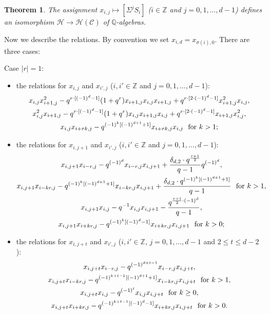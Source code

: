 \documentclass[reqno,12pt,a4paper]{amsart}
\newtheorem{theorem}{Theorem}[section]
\theoremstyle{remark}
\theoremstyle{definition}
\newcommand{\cc}{{\mathcal C}}
\newcommand{\ch}{{\mathcal H}}
\numberwithin{equation}{section}
\begin{document}
\begin{theorem}\label{thm-for-linear}
The assignment $x_{i,j}\mapsto [\Sigma^{j}S_i]$ ($i\in\mathbb{Z}$ and $j=0,1,\ldots,d-1$) defines an isomorphism $\ch\to\ch(\cc)$ of $\mathbb{Q}$-algebras.
\end{theorem}

Now we describe the relations. By convention we set $x_{i,d}=x_{\sigma(i),0}$. There are three cases:

\smallskip
\noindent Case $|r|=1$:
\begin{itemize}
   \item[(1)] the relations for $x_{i,j}$ and $x_{i',j}$ ($i,i'\in\mathbb{Z}$ and $j=0,1,\ldots,d-1$):
   \begin{gather*}
   	x_{i,j}x_{i+1,j}^2-q^{r\cdot[(-1)^d-1]}(1+q^{r})x_{i+1,j}x_{i,j}x_{i+1,j}+q^{r\cdot[2\cdot(-1)^d-1]}x_{i+1,j}^2x_{i,j},\\
   	x_{i,j}^2x_{i+1,j}-q^{r\cdot[(-1)^d-1]}(1+q^{r})x_{i,j}x_{i+1,j}x_{i,j}+q^{r\cdot[2\cdot(-1)^d-1]}x_{i+1,j}x_{i,j}^2,\\
   	x_{i,j}x_{i+rk,j}-q^{(-1)^{k}[(-1)^{d+1}+1]}x_{i+rk,j}x_{i,j} ~\hbox{ for $k>1$;}
   \end{gather*}
 
 
 \item[(2)] the relations for $x_{i,j+1}$ and $x_{i',j}$ ($i,i'\in\mathbb{Z}$ and $j=0,1,\ldots,d-1$):
 \begin{gather*}
 	x_{i,j+1}x_{i-r,j}-q^{(-1)^{d}}x_{i-r,j}x_{i,j+1}+\frac{\delta_{d,2}\cdot q^{\frac{r+1}{2}}}{q-1}q^{(-1)^{d}},\\
 	x_{i,j+1}x_{i-kr,j}-q^{(-1)^{k}[(-1)^{d+1}+1]}x_{i-kr,j}x_{i,j+1}+\frac{\delta_{d,2}\cdot q^{(-1)^{k}[(-1)^{d+1}+1]}}{q-1}~\hbox{ for $k>1$},\\
 	x_{i,j+1}x_{i,j}-q^{-1}x_{i,j}x_{i,j+1}-\frac{q^{\frac{r+1}{2}\cdot(-1)^d}}{q-1},\\
 	x_{i,j+1}x_{i+kr,j}-q^{(-1)^{k}[(-1)^{d}-1]}x_{i+kr,j}x_{i,j+1} ~\hbox{ for $k>0$};
 \end{gather*}
   
  \item[(3)] the relations for $x_{i,j+t}$ and $x_{i',j}$ ($i,i'\in\mathbb{Z}$, $j=0,1,\ldots,d-1$ and $2\leq t\leq d-2$):
  \begin{gather*}
  	x_{i,j+t}x_{i-r,j}-q^{(-1)^{d+t-1}}x_{i-r,j}x_{i,j+t},\\
  	x_{i,j+t}x_{i-kr,j}-q^{(-1)^{k+t-1}[(-1)^{d+1}+1]}x_{i-kr,j}x_{i,j+t} ~\hbox{ for $k>1$},\\
  	x_{i,j+t}x_{i,j}-q^{(-1)^{t}}x_{i,j}x_{i,j+t} ~\hbox{ for $k\geq0$},\\
  	x_{i,j+t}x_{i+kr,j}-q^{(-1)^{k+t-1}[(-1)^{d}-1]}x_{i+kr,j}x_{i,j+t} ~\hbox{ for $k>0$}.
  \end{gather*}
\end{itemize}
\end{document}
